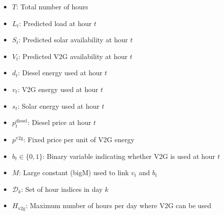 \documentclass[letterpaper,10pt,english]{sphinxmanual}
\begin{document}
\sphinxAtStartPar
{}
\begin{itemize}
\item {} 
\sphinxAtStartPar
\(T\): Total number of hours

\item {} 
\sphinxAtStartPar
\(L_t\): Predicted load at hour \(t\)

\item {} 
\sphinxAtStartPar
\(S_t\): Predicted solar availability at hour \(t\)

\item {} 
\sphinxAtStartPar
\(V_t\): Predicted V2G availability at hour \(t\)

\item {} 
\sphinxAtStartPar
\(d_t\): Diesel energy used at hour \(t\)

\item {} 
\sphinxAtStartPar
\(v_t\): V2G energy used at hour \(t\)

\item {} 
\sphinxAtStartPar
\(s_t\): Solar energy used at hour \(t\)

\item {} 
\sphinxAtStartPar
\(p_t^{\text{diesel}}\): Diesel price at hour \(t\)

\item {} 
\sphinxAtStartPar
\(p^{\text{v2g}}\): Fixed price per unit of V2G energy

\item {} 
\sphinxAtStartPar
\(b_t \in \{0,1\}\): Binary variable indicating whether V2G is used at hour \(t\)

\item {} 
\sphinxAtStartPar
\(M\): Large constant (big\sphinxhyphen{}M) used to link \(v_t\) and \(b_t\)

\item {} 
\sphinxAtStartPar
\(\mathcal{D}_k\): Set of hour indices in day \(k\)

\item {} 
\sphinxAtStartPar
\(H_{\text{v2g}}\): Maximum number of hours per day where V2G can be used

\end{itemize}
\end{document}
